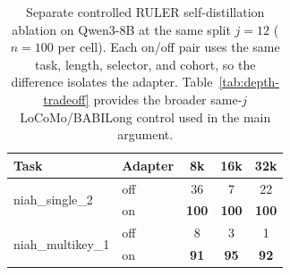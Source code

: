\begin{table}[t]
\centering
\small
\setlength{\tabcolsep}{4pt}
\begin{tabular}{@{}llccc@{}}
\toprule
\textbf{Task} & \textbf{Adapter} & \textbf{8k} & \textbf{16k} & \textbf{32k} \\
\midrule
\multirow{2}{*}{niah\_single\_2}
  & off & 36 & 7 & 22 \\
  & on  & \textbf{100} & \textbf{100} & \textbf{100} \\
\midrule
\multirow{2}{*}{niah\_multikey\_1}
  & off & 8 & 3 & 1 \\
  & on  & \textbf{91} & \textbf{95} & \textbf{92} \\
\bottomrule
\end{tabular}
\caption{Separate controlled RULER self-distillation ablation on Qwen3-8B at
the same split $j{=}12$ ($n{=}100$ per cell). Each on/off pair uses the same
task, length, selector, and cohort, so the difference isolates the adapter.
Table~\ref{tab:depth-tradeoff} provides the broader same-$j$ LoCoMo/BABILong
control used in the main argument.}
\label{tab:adapter}
\end{table}
